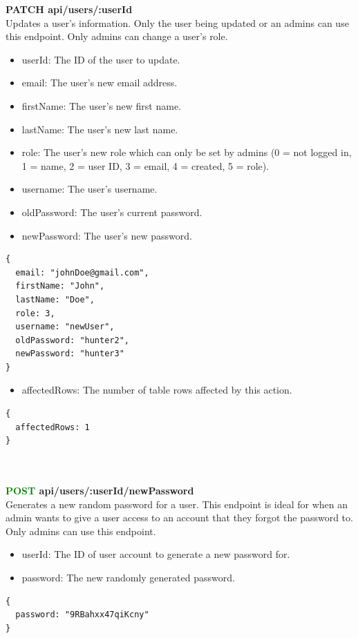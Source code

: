 \documentclass[onecolumn, draftclsnofoot,10pt, compsoc, usenames, dvipsnames]{IEEEtran}
\begin{document}
\noindent
\textbf{\textcolor{BlueGreen}{PATCH} api/users/:userId} \\
Updates a user's information. Only the user being updated or an admins can use this endpoint. Only admins can change a user's role.
\begin{itemize}
    \item userId: The ID of the user to update.
    \item email: The user's new email address.
    \item firstName: The user's new first name.
    \item lastName: The user's new last name.
    \item role: The user's new role which can only be set by admins (0 = not logged in, 1 = name, 2 = user ID, 3 = email, 4 = created, 5 = role).
    \item username: The user's username.
    \item oldPassword: The user's current password. 
    \item newPassword: The user's new password.
\end{itemize}
\begin{lstlisting}[caption=Example Request Body]
{
  email: "johnDoe@gmail.com",
  firstName: "John",
  lastName: "Doe",
  role: 3,
  username: "newUser",
  oldPassword: "hunter2",
  newPassword: "hunter3"
}
\end{lstlisting}
\begin{itemize}
  \item affectedRows: The number of table rows affected by this action.
\end{itemize}
\begin{lstlisting}[caption=Example Response]
{ 
  affectedRows: 1
}
\end{lstlisting}
\\~\\


\noindent
\textbf{\textcolor{Green}{POST} api/users/:userId/newPassword} \\
Generates a new random password for a user. This endpoint is ideal for when an admin wants to give a user access to an account that they forgot the password to. Only admins can use this endpoint.
\begin{itemize}
    \item userId: The ID of user account to generate a new password for.
    \item password: The new randomly generated password.
\end{itemize}
\begin{lstlisting}[caption=Example Response]
{ 
  password: "9RBahxx47qiKcny"
}
\end{lstlisting}
\\~\\
\end{document}
